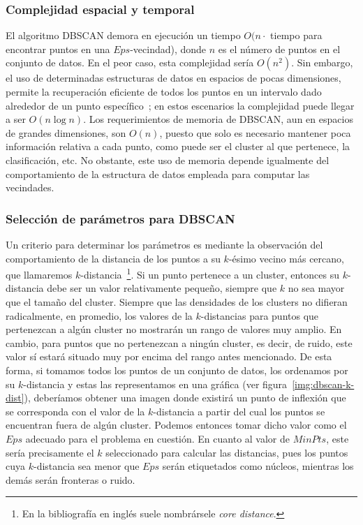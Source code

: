 \subsubsection{Complejidad espacial y temporal}

El algoritmo DBSCAN demora en ejecución un tiempo $O(n \cdot$ tiempo para encontrar puntos en una $Eps$-vecindad), donde $n$ es el número de puntos en el conjunto de datos.
En el peor caso, esta complejidad sería $O(n^2)$.
Sin embargo, el uso de determinadas estructuras de datos en espacios de pocas dimensiones, permite la recuperación eficiente de todos los puntos en un intervalo dado alrededor de un punto específico~\cite{Tan05};
en estos escenarios la complejidad puede llegar a ser $O(n\log n)$.
Los requerimientos de memoria de DBSCAN, aun en espacios de grandes dimensiones, son $O(n)$, puesto que solo es necesario mantener poca información relativa a cada punto, como puede ser el cluster al que pertenece, la clasificación, etc.
No obstante, este uso de memoria depende igualmente del comportamiento de la estructura de datos empleada para computar las vecindades.

\subsubsection{Selección de parámetros para DBSCAN}\label{subsubsec:paramsDBSCAN}

Un criterio para determinar los parámetros es mediante la observación del comportamiento de la distancia de los puntos a su $k$-ésimo vecino más cercano, que llamaremos $k$-distancia~\footnote{En la bibliografía en inglés suele nombrársele \textit{core distance}.}.
Si un punto pertenece a un cluster, entonces su $k$-distancia debe ser un valor relativamente pequeño, siempre que $k$ no sea mayor que el tamaño del cluster.
Siempre que las densidades de los clusters no difieran radicalmente, en promedio, los valores de la $k$-distancias para puntos que pertenezcan a algún cluster no mostrarán un rango de valores muy amplio.
En cambio, para puntos que no pertenezcan a ningún cluster, es decir, de ruido, este valor sí estará situado muy por encima del rango antes mencionado.
De esta forma, si tomamos todos los puntos de un conjunto de datos, los ordenamos por su $k$-distancia y estas las representamos en una gráfica (ver figura~\ref{img:dbscan-k-dist}), deberíamos obtener una imagen donde existirá un punto de inflexión que se corresponda con el valor de la $k$-distancia a partir del cual los puntos se encuentran fuera de algún cluster.
Podemos entonces tomar dicho valor como el $Eps$ adecuado para el problema en cuestión.
En cuanto al valor de $MinPts$, este sería precisamente el $k$ seleccionado para calcular las distancias, pues los puntos cuya $k$-distancia sea menor que $Eps$ serán etiquetados como núcleos, mientras los demás serán fronteras o ruido.

